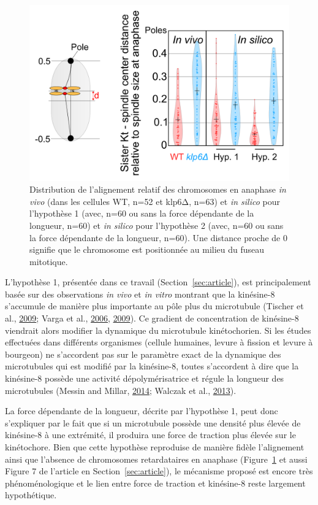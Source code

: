 \documentclass[12pt,a4paper,twoside,openright]{book}
\begin{document}
\begin{figure}[htbp]
\centering
\includegraphics{figures/results/modelling/ch_alignment.png}
\caption[Distribution de l'alignement relatif des chromosomes en anaphase]{\label{fig:ch-alignment}Distribution
de l'alignement relatif des chromosomes en anaphase \emph{in vivo} (dans
les cellules WT, n=52 et klp6Δ, n=63) et \emph{in silico} pour
l'hypothèse 1 (avec, n=60 ou sans la force dépendante de la longueur,
n=60) et \emph{in silico} pour l'hypothèse 2 (avec, n=60 ou sans la
force dépendante de la longueur, n=60). Une distance proche de 0
signifie que le chromosome est positionnée au milieu du fuseau
mitotique.}
\end{figure}

L'hypothèse 1, présentée dans ce travail (Section~\ref{sec:article}),
est principalement basée sur des observations \emph{in vivo} et \emph{in
vitro} montrant que la kinésine-8 s'accumule de manière plus importante
au pôle plus du microtubule (Tischer et al.,
\hyperref[ref-Tischer2009]{2009}; Varga et al.,
\hyperref[ref-Varga2006]{2006}, \hyperref[ref-Varga2009]{2009}). Ce
gradient de concentration de kinésine-8 viendrait alors modifier la
dynamique du microtubule kinétochorien. Si les études effectuées dans
différents organismes (cellule humaines, levure à fission et levure à
bourgeon) ne s'accordent pas sur le paramètre exact de la dynamique des
microtubules qui est modifié par la kinésine-8, toutes s'accordent à
dire que la kinésine-8 possède une activité dépolymérisatrice et régule
la longueur des microtubules (Messin and Millar,
\hyperref[ref-Messin2014]{2014}; Walczak et al.,
\hyperref[ref-Walczak2013a]{2013}).

La force dépendante de la longueur, décrite par l'hypothèse 1, peut donc
s'expliquer par le fait que si un microtubule possède une densité plus
élevée de kinésine-8 à une extrémité, il produira une force de traction
plus élevée sur le kinétochore. Bien que cette hypothèse reproduise de
manière fidèle l'alignement ainsi que l'absence de chromosomes
retardataires en anaphase (Figure~\ref{fig:ch-alignment} et aussi Figure
7 de l'article en Section~\ref{sec:article}), le mécanisme proposé est
encore très phénoménologique et le lien entre force de traction et
kinésine-8 reste largement hypothétique.
\end{document}
